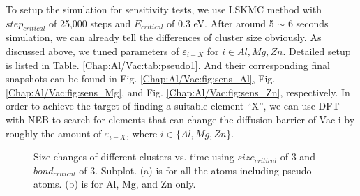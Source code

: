 To setup the simulation for sensitivity tests, we use \ac{LSKMC} method with $step_{critical}$ of 25,000 steps and $E_{critical}$ of 0.3 eV. After around 5 $\sim$ 6 seconds simulation, we can already tell the differences of cluster size obviously. As discussed above, we tuned parameters of $\varepsilon_{i-X}$ for $i \in {Al, Mg, Zn}$. Detailed setup is listed in Table. \ref{Chap:Al/Vac:tab:pseudo1}. And their corresponding final snapshots can be found in Fig. \ref{Chap:Al/Vac:fig:sens_Al}, Fig. \ref{Chap:Al/Vac:fig:sens_Mg}, and Fig. \ref{Chap:Al/Vac:fig:sens_Zn}, respectively. In order to achieve the target of finding a suitable element ``X'', we can use \ac{DFT} with \ac{NEB} to search for elements that can change the diffusion barrier of Vac-i by roughly the amount of $\varepsilon_{i-X}$, where $i \in \{Al, Mg, Zn\}$.


\newpage
\begingroup
\begin{figure}[!ht]
  \centering
\caption[Size changes of different clusters vs. time using $size_{critical}$ of 3 and $bond_{critical}$ of 3.]{Size changes of different clusters vs. time using $size_{critical}$ of 3 and $bond_{critical}$ of 3. Subplot. (a) is for all the atoms including pseudo atoms. (b) is for Al, Mg, and Zn only.}
\label{Chap:Al/Vac:fig:sens_cluster_size}
\end{figure}
\endgroup

